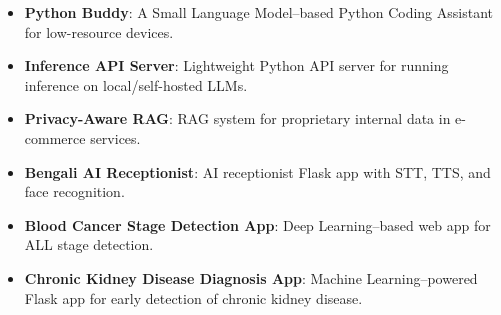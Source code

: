 

{\fontsize{9pt}{11pt}
\selectfont\bodyfont\color{text}
\begin{itemize}[leftmargin=*]

\item \textbf{Python Buddy}: A Small Language Model–based Python Coding Assistant for low-resource devices. 
\href{https://github.com/taufiq-ai/slm-python-buddy}{\faGithub}

\item \textbf{Inference API Server}: Lightweight Python API server for running inference on local/self-hosted LLMs. 
\href{https://github.com/taufiq-ai/slm-api-server}{\faGithub}

\item \textbf{Privacy-Aware RAG}: RAG system for proprietary internal data in e-commerce services. 
\href{https://github.com/taufiq-ai/Privacy-Aware-RAG}{\faGithub}

\item \textbf{Bengali AI Receptionist}: AI receptionist Flask app with STT, TTS, and face recognition. 
\href{https://github.com/taufiq-ai/Bengali-AI-Recieptionist}{\faGithub}

\item \textbf{Blood Cancer Stage Detection App}: Deep Learning–based web app for ALL stage detection. 
\href{https://github.com/taufiq-ai/Vision-Blood-Cancer-Stage-Detection}{\faGithub}
\href{https://blood-cancer-stage-detection.onrender.com/}{\textcolor{Cerulean}{\faExternalLink*}}

\item \textbf{Chronic Kidney Disease Diagnosis App}: Machine Learning–powered Flask app for early detection of chronic kidney disease. 
\href{https://github.com/taufiq-ai/ML-Kidney-Disease-Diagnosis}{\faGithub}
\href{https://kidney-disease-diagnosis.onrender.com/}{\textcolor{Cerulean}{\faExternalLink*}}

\end{itemize}
}
